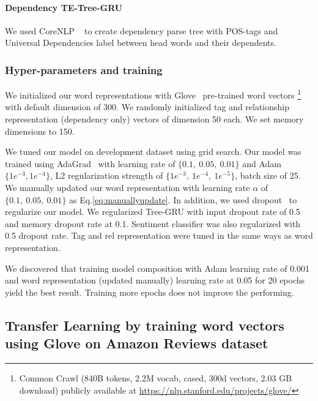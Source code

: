 \paragraph{Dependency TE-Tree-GRU}
We used CoreNLP ~\cite{manning2014stanford} to create dependency parse tree with POS-tags and  Universal Dependencies label between head words and their dependents.


\subsubsection{Hyper-parameters and training}
We initialized our word representations with Glove~\cite{glove} pre-trained word vectors \footnote{Common Crawl (840B tokens, 2.2M vocab, cased, 300d vectors, 2.03 GB download) publicly available at \url{https://nlp.stanford.edu/projects/glove/}}  with default dimension of 300.  We randomly initialized tag and relationship representation (dependency only) vectors of dimension 50 each. 
We set memory dimensions to 150.

We tuned our model on development dataset using grid search.
Our model was trained using AdaGrad~\cite{duchi2011adaptive} with learning rate of $\{0.1,~ 0.05,~ 0.01\}$ and Adam $\{1e^{-3}, 1e^{-4}\}$, L2 regularization strength of $\{1e^{-3},~ 1e^{-4}, ~ 1e^{-5} \}$, batch size of 25. 
We manually updated our word representation with learning rate $\alpha$ of $\{0.1,~0.05, ~0.01\}$ as Eq.\ref{eq:manuallyupdate}. 
In addition, we used dropout~\cite{krizhevsky2012imagenet} to regularize our model. 
We regularized Tree-GRU with input dropout rate of 0.5 and memory dropout rate at 0.1. 
Sentiment classifier was also regularized with 0.5 dropout rate. 
Tag and rel representation were tuned in the same ways as word representation.

We discovered that training model composition with Adam learning rate of 0.001 and word representation (updated manually) learning rate at 0.05 for 20 epochs yield the best result.
Training more epochs does not improve the performing.

\subsection{Transfer Learning by training word vectors using Glove on Amazon Reviews dataset}
